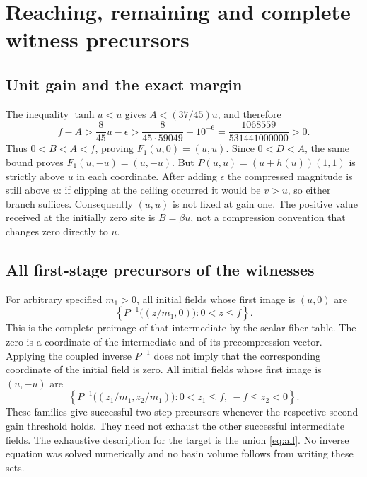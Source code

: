 \documentclass[11pt,a4paper]{article}
\theoremstyle{definition}
\theoremstyle{remark}\newtheorem{remark}[theorem]{Remark}
\numberwithin{equation}{section}
\begin{document}
\section{Reaching, remaining and complete witness precursors}\label{sec:interpretation}
\subsection{Unit gain and the exact margin}
The inequality $\tanh u<u$ gives $A<(37/45)u$, and therefore
\begin{equation}\label{eq:unitmargin}
 f-A>\frac8{45}u-\epsilon
 >\frac8{45\cdot59049}-10^{-6}
 =\frac{1068559}{531441000000}>0.
\end{equation}
Thus $0<B<A<f$, proving $F_1(u,0)=(u,u)$.
Since $0<D<A$, the same bound proves $F_1(u,-u)=(u,-u)$.
But $P(u,u)=(u+h(u))(1,1)$ is strictly above $u$ in each coordinate.
After adding $\epsilon$ the compressed magnitude is still above $u$:
if clipping at the ceiling occurred it would be $v>u$, so either branch suffices.
Consequently $(u,u)$ is not fixed at gain one.
The positive value received at the initially zero site is $B=\beta u$,
not a compression convention that changes zero directly to $u$.

\subsection{All first-stage precursors of the witnesses}
For arbitrary specified $m_1>0$, all initial fields whose first image is $(u,0)$ are
\begin{equation}\label{eq:precsame}
 \left\{P^{-1}\bigl((z/m_1,0)\bigr):0<z\leq f\right\}.
\end{equation}
This is the complete preimage of that intermediate by the scalar fiber table.
The zero is a coordinate of the intermediate and of its precompression vector.
Applying the coupled inverse $P^{-1}$ does not imply that the corresponding
coordinate of the initial field is zero.
All initial fields whose first image is $(u,-u)$ are
\begin{equation}\label{eq:precopp}
 \left\{P^{-1}\bigl((z_1/m_1,z_2/m_1)\bigr):
               0<z_1\leq f,\ -f\leq z_2<0\right\}.
\end{equation}
These families give successful two-step precursors whenever the respective
second-gain threshold holds. They need not exhaust the other successful intermediate
fields. The exhaustive description for the target is the union \eqref{eq:all}.
No inverse equation was solved numerically and no basin volume follows from
writing these sets.
\end{document}
